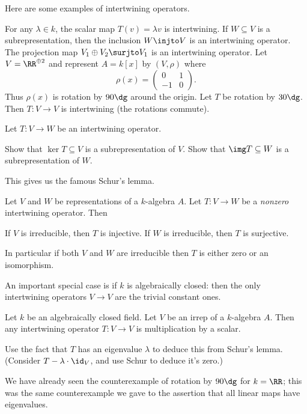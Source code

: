 Here are some examples of intertwining operators.
\begin{example}
	\listhack
	\begin{enumerate}[(a)]
		\ii For any $\lambda \in k$, the scalar map $T(v) = \lambda v$
		is intertwining.
		\ii If $W \subseteq V$ is a subrepresentation,
		then the inclusion $W \injto V$ is an intertwining operator.
		\ii The projection map $V_1 \oplus V_2 \surjto V_1$
		is an intertwining operator.
		\ii Let $V  = \RR^{\oplus 2}$ 
		and represent $A = k[x]$ by $(V, \rho)$ where
		\[ \rho(x) = \begin{pmatrix} 0 & 1 \\ -1 & 0 \end{pmatrix}. \]
		Thus $\rho(x)$ is rotation by $90\dg$ around the origin.
		Let $T$ be rotation by $30\dg$.
		Then $T : V \to V$ is intertwining (the rotations commute).
	\end{enumerate}
\end{example}

\begin{exercise}
	Let $T : V \to W$ be an intertwining operator.
	\begin{enumerate}[(a)]
		\ii Show that $\ker T \subseteq V$ is a subrepresentation of $V$.
		\ii Show that $\img T \subseteq W$ is a subrepresentation of $W$.
	\end{enumerate}
\end{exercise}

This gives us the famous Schur's lemma.
\begin{theorem}
	Let $V$ and $W$ be representations of a $k$-algebra $A$.
	Let $T : V \to W$ be a \emph{nonzero} intertwining operator.
	Then
	\begin{enumerate}[(a)]
		\ii If $V$ is irreducible, then $T$ is injective.
		\ii If $W$ is irreducible, then $T$ is surjective.
	\end{enumerate}
	In particular if both $V$ and $W$ are irreducible then $T$
	is either zero or an isomorphism.
\end{theorem}
An important special case is if $k$ is algebraically closed:
then the only intertwining operators $V \to V$
are the trivial constant ones.
\begin{theorem}
	Let $k$ be an algebraically closed field.
	Let $V$ be an irrep of a $k$-algebra $A$.
	Then any intertwining operator $T : V \to V$ is multiplication by a scalar.
\end{theorem}
\begin{exercise}
	Use the fact that $T$ has an eigenvalue $\lambda$ to
	deduce this from Schur's lemma.
	(Consider $T - \lambda \cdot \id_V$, and use Schur to deduce it's zero.)
\end{exercise}
We have already seen the counterexample of rotation by $90\dg$ for $k = \RR$;
this was the same counterexample we gave to the assertion that all linear maps
have eigenvalues.

